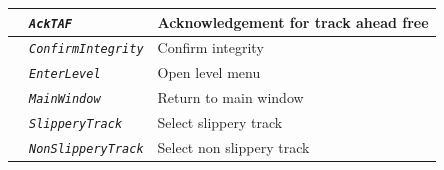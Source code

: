\documentclass{template/openetcs}
\begin{document}
\begin{itemize}
\begin{longtable}{|l|l|l|}
			\hline
			
			&	\begin{minipage}[t]{0.40\linewidth} \emph{\texttt{AckTAF}} \end{minipage}
			&	\begin{minipage}[t]{0.38\linewidth} Acknowledgement for track ahead free \end{minipage} \\
			
			\hline
			
			&	\begin{minipage}[t]{0.40\linewidth} \emph{\texttt{ConfirmIntegrity}} \end{minipage}
			&	\begin{minipage}[t]{0.38\linewidth} Confirm integrity \end{minipage} \\
			
			\hline
			
			&	\begin{minipage}[t]{0.40\linewidth} \emph{\texttt{EnterLevel}} \end{minipage}
			&	\begin{minipage}[t]{0.38\linewidth} Open level menu \end{minipage} \\
			
			\hline
			
			&	\begin{minipage}[t]{0.40\linewidth} \emph{\texttt{MainWindow}} \end{minipage}
			&	\begin{minipage}[t]{0.38\linewidth} Return to main window \end{minipage} \\
			
			\hline
			
			&	\begin{minipage}[t]{0.40\linewidth} \emph{\texttt{SlipperyTrack}} \end{minipage}
			&	\begin{minipage}[t]{0.38\linewidth} Select slippery track \end{minipage} \\
			
			\hline
			
			&	\begin{minipage}[t]{0.40\linewidth} \emph{\texttt{NonSlipperyTrack}} \end{minipage}
			&	\begin{minipage}[t]{0.38\linewidth} Select non slippery track \end{minipage} \\
			

\end{longtable}
\end{itemize}
\end{document}
